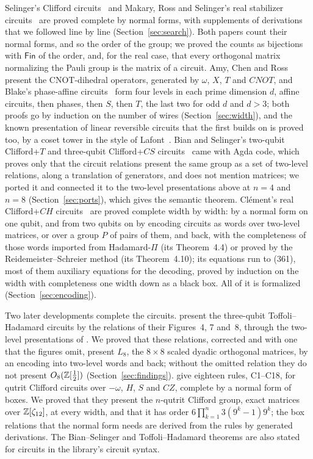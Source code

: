 Selinger's Clifford circuits~\cite{selinger2015clifford} and Makary,
Ross and Selinger's real stabilizer circuits~\cite{makary2021real} are
proved complete by normal forms, with supplements of derivations that
we followed line by line (Section~\ref{sec:search}). Both papers count
their normal forms, and so the order of the group; we proved the
counts as bijections with $\mathsf{Fin}$ of the order, and, for the
real case, that every orthogonal matrix normalizing the Pauli group
is the matrix of a circuit. Amy, Chen and Ross~\cite{amy2018cnotdihedral} present the
CNOT-dihedral operators, generated by $\omega$, $X$, $T$ and $CNOT$,
and Blake's phase-affine circuits~\cite{blake2026phaseaffine} form four
levels in each prime dimension $d$, affine circuits, then phases, then
$S$, then $T$, the last two for odd $d$ and $d>3$; both proofs go by
induction on the number of wires (Section~\ref{sec:width}), and the
known presentation of linear reversible circuits that the first builds
on is proved too, by a coset tower in the style of
Lafont~\cite{lafont2003boolean}. Bian and Selinger's two-qubit
Clifford+$T$ and three-qubit Clifford+$CS$
circuits~\cite{bian2023cliffordt2,bian2023cliffordcs3} came with Agda
code, which proves only that the circuit relations present the same
group as a set of two-level relations, along a translation of
generators, and does not mention matrices; we ported it and connected
it to the two-level presentations above at $n=4$ and $n=8$
(Section~\ref{sec:ports}), which gives the semantic theorem.
Cl\'ement's real Clifford+$CH$
circuits~\cite{clement2026realcliffordch} are proved complete width by
width: by a normal form on one qubit, and from two qubits on by
encoding circuits as words over two-level matrices, or over a group $P$
of pairs of them, and back, with the completeness of those words
imported from Hadamard-$\Pi$ (its Theorem~4.4) or proved by the
Reidemeister--Schreier method (its Theorem~4.10); its equations run to
(361), most of them auxiliary equations for the decoding, proved by
induction on the width with completeness one width down as a black
box. All of it is formalized (Section~\ref{sec:encoding}).

Two later developments complete the circuits.
\citet{amy2024toffoli} present the three-qubit Toffoli--Hadamard
circuits by the relations of their Figures~4, 7 and~8, through the
two-level presentations of \citet{li2021on}. We proved that these
relations, corrected and with one that the figures omit, present $L_8$,
the $8\times8$ scaled dyadic orthogonal matrices, by an encoding into
two-level words and back; without the omitted relation they do not
present $O_8(\mathbb{Z}[\frac12])$ (Section~\ref{sec:findings}).
\citet{li2025qutrit} give eighteen rules, C1--C18, for qutrit Clifford
circuits over $-\omega$, $H$, $S$ and $CZ$, complete by a normal form
of boxes. We proved that they present the $n$-qutrit Clifford group,
exact matrices over $\mathbb{Z}[\zeta_{12}]$, at every width, and that it has
order $6\prod_{k=1}^n 3(9^k-1)9^k$; the box relations that the normal
form needs are derived from the rules by generated derivations. The
Bian--Selinger and Toffoli--Hadamard theorems are also stated for
circuits in the library's circuit syntax.

